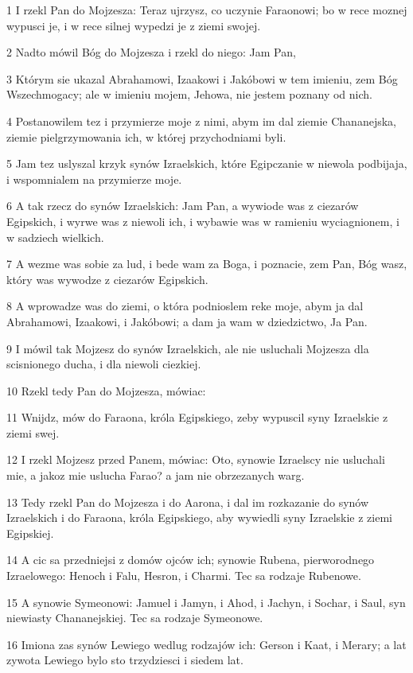 \par 1 I rzekl Pan do Mojzesza: Teraz ujrzysz, co uczynie Faraonowi; bo w rece moznej wypusci je, i w rece silnej wypedzi je z ziemi swojej.
\par 2 Nadto mówil Bóg do Mojzesza i rzekl do niego: Jam Pan,
\par 3 Którym sie ukazal Abrahamowi, Izaakowi i Jakóbowi w tem imieniu, zem Bóg Wszechmogacy; ale w imieniu mojem, Jehowa, nie jestem poznany od nich.
\par 4 Postanowilem tez i przymierze moje z nimi, abym im dal ziemie Chananejska, ziemie pielgrzymowania ich, w której przychodniami byli.
\par 5 Jam tez uslyszal krzyk synów Izraelskich, które Egipczanie w niewola podbijaja, i wspomnialem na przymierze moje.
\par 6 A tak rzecz do synów Izraelskich: Jam Pan, a wywiode was z ciezarów Egipskich, i wyrwe was z niewoli ich, i wybawie was w ramieniu wyciagnionem, i w sadziech wielkich.
\par 7 A wezme was sobie za lud, i bede wam za Boga, i poznacie, zem Pan, Bóg wasz, który was wywodze z ciezarów Egipskich.
\par 8 A wprowadze was do ziemi, o która podnioslem reke moje, abym ja dal Abrahamowi, Izaakowi, i Jakóbowi; a dam ja wam w dziedzictwo, Ja Pan.
\par 9 I mówil tak Mojzesz do synów Izraelskich, ale nie usluchali Mojzesza dla scisnionego ducha, i dla niewoli ciezkiej.
\par 10 Rzekl tedy Pan do Mojzesza, mówiac:
\par 11 Wnijdz, mów do Faraona, króla Egipskiego, zeby wypuscil syny Izraelskie z ziemi swej.
\par 12 I rzekl Mojzesz przed Panem, mówiac: Oto, synowie Izraelscy nie usluchali mie, a jakoz mie uslucha Farao? a jam nie obrzezanych warg.
\par 13 Tedy rzekl Pan do Mojzesza i do Aarona, i dal im rozkazanie do synów Izraelskich i do Faraona, króla Egipskiego, aby wywiedli syny Izraelskie z ziemi Egipskiej.
\par 14 A cic sa przedniejsi z domów ojców ich; synowie Rubena, pierworodnego Izraelowego: Henoch i Falu, Hesron, i Charmi. Tec sa rodzaje Rubenowe.
\par 15 A synowie Symeonowi: Jamuel i Jamyn, i Ahod, i Jachyn, i Sochar, i Saul, syn niewiasty Chananejskiej. Tec sa rodzaje Symeonowe.
\par 16 Imiona zas synów Lewiego wedlug rodzajów ich: Gerson i Kaat, i Merary; a lat zywota Lewiego bylo sto trzydziesci i siedem lat.
